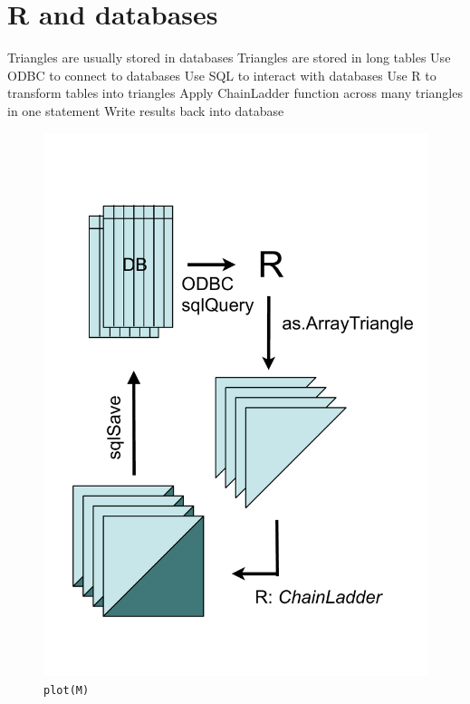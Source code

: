 \documentclass[a4paper]{article}
\begin{document}
\section{R and databases}
Triangles are usually stored in databases
Triangles are stored in long tables
Use ODBC to connect to databases
Use SQL to interact with databases
Use R to transform tables into triangles
Apply ChainLadder function across many triangles in one statement
Write results back into database
\begin{figure}[h]
  \begin{center}
\includegraphics{Rdatabases}
    \caption{\texttt{plot(M)}}
  \end{center}
\end{figure}
\end{document}
